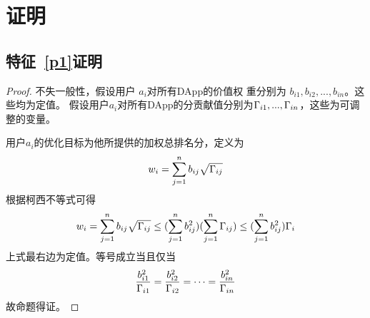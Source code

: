\section{证明}
\subsection{特征~\ref{p1}证明}
\label{subsection:proof1}
\begin{proof}

不失一般性，假设用户 $a_i$对所有DApp的价值权
重分别为 $b_{i1}, b_{i2}, ..., b_{in}$。这些均为定值。
假设用户$a_i$对所有DApp的分贡献值分别为$\Gamma_{i1},...,\Gamma_{in}$，这些为可调整的变量。

用户$a_i$的优化目标为他所提供的加权总排名分，定义为
$$w_i = \sum_{j=1}^n b_{ij}\sqrt{\Gamma_{ij}}$$
根据柯西不等式可得
$$w_i = \sum_{j=1}^n b_{ij}\sqrt{\Gamma_{ij}} \leq (\sum_{j=1}^n b_{ij}^2)(\sum_{j=1}^n \Gamma_{ij}) \leq (\sum_{j=1}^n b_{ij}^2)\Gamma_i$$
上式最右边为定值。等号成立当且仅当
$$\frac{b_{i1}^2}{\Gamma_{i1}}=\frac{b_{i2}^2}{\Gamma_{i2}}=\cdots=\frac{b_{in}^2}{\Gamma_{in}}$$
故命题得证。

\end{proof}
